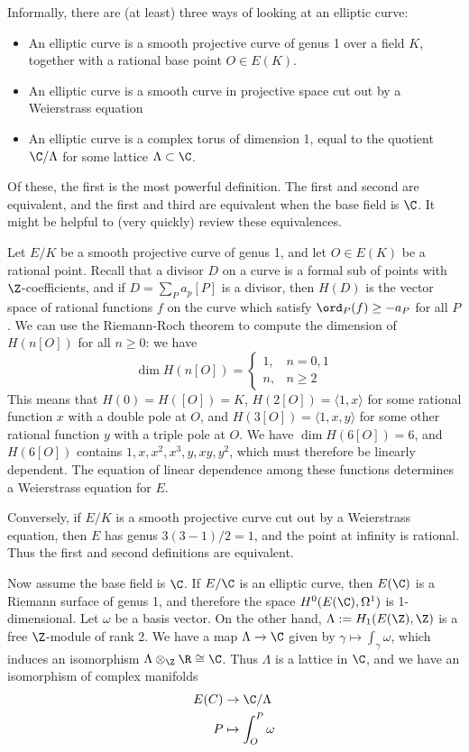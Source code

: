 Informally, there are (at least) three ways of looking at an elliptic curve:
	\begin{itemize}
	\item An elliptic curve is a smooth projective curve of genus 1 over a field $K$,
together with a rational base point $O \in E(K)$.
	\item An elliptic curve is a smooth curve in projective space cut out by a
Weierstrass equation 
	\item An  elliptic curve is a complex torus of dimension 1, equal to the quotient
$\C/\Lambda$ for some lattice $\Lambda \subset \C$.
	\end{itemize}

Of these, the first is the most powerful definition. The first and second are equivalent, and the first and third are equivalent when the base field is $\C$. It might be helpful to (very quickly) review these equivalences.


Let $E/K$ be a smooth projective curve of genus 1, and let $O \in E(K)$ be a rational point. Recall that a divisor $D$ on a curve is a formal sub of points with $\Z$-coefficients, and if $D= \sum_P a_p[P]$ is a divisor, then $H(D)$ is the vector space of rational functions $f$ on the curve which satisfy $\ord_P(f) \geq -a_P$ for all $P$. We can use the Riemann-Roch theorem to compute the dimension of $H(n[O])$ for all $n \geq 0$: we have
	\[
	\dim H(n[O])= 
	\begin{cases}
	1, & n= 0,1 \\
	n, & n \geq 2
	\end{cases}
	\]
This means that $H(0)= H([O])= K$, $H(2[O])= \langle 1,x \rangle$ for some rational function $x$ with a double pole at $O$, and $H(3[O])= \langle 1,x,y \rangle$ for some other rational function $y$ with a triple pole at $O$. We have $\dim H(6[O])= 6$, and $H(6[O])$ contains $1,x,x^2,x^3,y,xy,y^2$, which must therefore be linearly dependent. The equation of linear dependence among these functions determines a Weierstrass equation for $E$. 


Conversely, if $E/K$ is a smooth projective curve cut out by a Weierstrass equation, then $E$ has genus $3(3 - 1)/2= 1$, and the point at infinity is rational. Thus the first and second definitions are equivalent. 


Now assume the base field is $\C$. If $E/\C$ is an elliptic curve, then $E(\C)$ is a Riemann surface of genus 1, and therefore the space $H^0(E(\C), \Omega^1)$ is 1-dimensional. Let $\omega$ be a basis vector. On the other hand, $\Lambda:= H_1(E(\Z),\Z)$ is a free $\Z$-module of rank 2. We have a map $\Lambda \to \C$ given by $\gamma \mapsto \int_\gamma \omega$, which induces an isomorphism $\Lambda \otimes_\Z \R \cong \C$. Thus $\Lambda$ is a lattice in $\C$, and we have an isomorphism of complex manifolds
	\[
	\begin{aligned}
	E(C) &\to \C/\Lambda \\
	P &\mapsto \int_O^P \omega
	\end{aligned}
	\]

